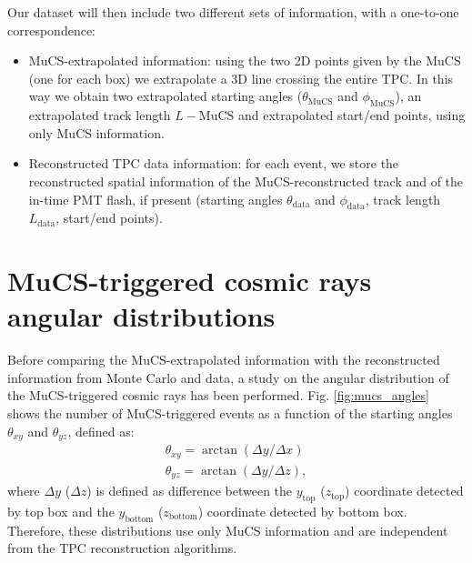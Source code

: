 \documentclass[a4paper]{scrartcl}
\begin{document}
Our dataset will then include two different sets of information, with a one-to-one correspondence: 
\begin{itemize}
\item MuCS-extrapolated information: using the two 2D points given by the MuCS (one for each box) we extrapolate a 3D line crossing the entire TPC. In this way we obtain two extrapolated starting angles ($\theta_{\textrm{MuCS}}$ and $\phi_{\textrm{MuCS}}$), an extrapolated track length $L-{\textrm{MuCS}}$ and extrapolated start/end points, using only MuCS information.
\item Reconstructed TPC data information: for each event, we store the reconstructed spatial information of the MuCS-reconstructed track and of the in-time PMT flash, if present (starting angles $\theta_{\textrm{data}}$ and $\phi_{\textrm{data}}$, track length $L_{\textrm{data}}$, start/end points).
\end{itemize}

\section{MuCS-triggered cosmic rays angular distributions}\label{sec:flux}
Before comparing the MuCS-extrapolated information with the reconstructed information from Monte Carlo and data, a study on the angular distribution of the MuCS-triggered cosmic rays has been performed. 
Fig. \ref{fig:mucs_angles} shows the number of MuCS-triggered events as a function of the starting angles $\theta_{xy}$ and $\theta_{yz}$, defined as:
\begin{equation}
\begin{aligned}
\theta_{xy} = \arctan(\Delta y/\Delta x)\\ 
\theta_{yz} = \arctan(\Delta y/\Delta z),
\label{eq:angles}
\end{aligned}
\end{equation}
where $\Delta y$ ($\Delta z$) is defined as difference between the $y_{\mathrm{top}}$ ($z_{\mathrm{top}}$) coordinate detected by top box and the $y_{\mathrm{bottom}}$ ($z_{\mathrm{bottom}}$) coordinate detected by bottom box. Therefore, these distributions use only MuCS information and are independent from the TPC reconstruction algorithms.
\end{document}
